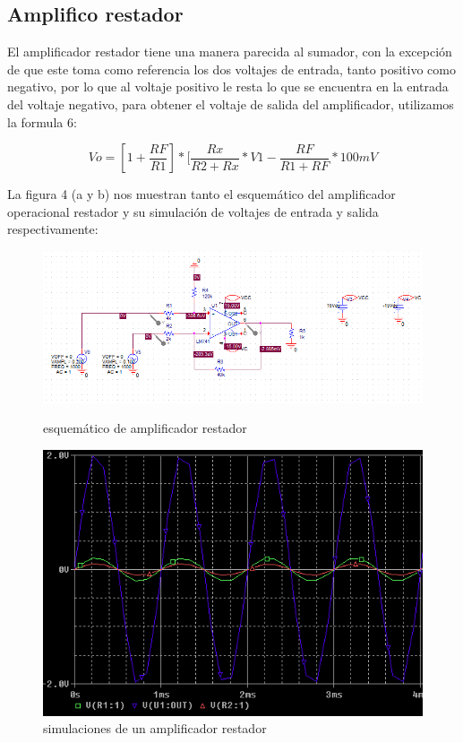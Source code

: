 \documentclass[11pt,a4paper]{article}
\begin{document}
\subsection{Amplifico restador}

El amplificador restador tiene una manera parecida al sumador, con la excepción de que este toma como referencia los dos voltajes de entrada, tanto positivo como negativo, por lo que al voltaje positivo le resta lo que se encuentra en la entrada del voltaje negativo, para obtener el voltaje de salida del amplificador, utilizamos la formula 6:

\begin{equation}
Vo=[1+\frac{RF}{R1}]*[\frac{Rx}{R2+Rx}*V1-\frac{RF}{R1+RF}*100mV
\end{equation}

La figura 4 (a y b) nos muestran tanto el esquemático del amplificador operacional restador y su simulación de voltajes de entrada y salida respectivamente:

\begin{figure}[ht]
\begin{center}
\includegraphics[scale=0.5]{7.PNG}
\caption{esquemático de amplificador restador}
\includegraphics[scale=0.5]{8.PNG}
\caption{simulaciones de un amplificador restador}
\end{center}
\end{figure}
\end{document}
